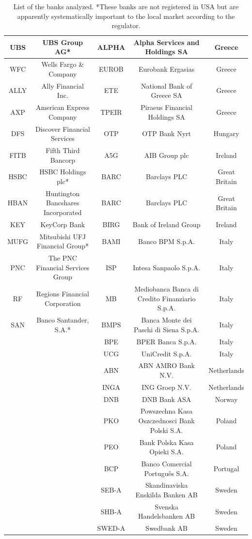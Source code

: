 \documentclass[12pt]{article}
\begin{document}
\begin{table}[!htbp]
\begin{center}
{\begin{tabular}{c|c||c |c|c}
			UBS & UBS Group AG* & ALPHA & Alpha Services and Holdings SA & Greece \\
			\hline
			WFC & Wells Fargo \& Company & EUROB & Eurobank Ergasias & Greece \\
			\hline
			ALLY & Ally Financial Inc. & ETE & National Bank of Greece SA & Greece \\
			\hline
			AXP & American Express Company & TPEIR & Piraeus Financial Holdings SA & Greece \\
			\hline
			DFS & Discover Financial Services & OTP & OTP Bank Nyrt & Hungary \\
			\hline
			FITB & Fifth Third Bancorp & A5G & AIB Group plc & Ireland \\
			\hline
			HSBC & HSBC Holdings plc* & BARC & Barclays PLC & Great Britain \\
			\hline
			HBAN & Huntington Bancshares Incorporated & BARC & Barclays PLC & Great Britain \\
			\hline
			KEY & KeyCorp Bank & BIRG & Bank of Ireland Group & Ireland \\
			\hline
			MUFG & Mitsubishi UFJ Financial Group* & BAMI & Banco BPM S.p.A. & Italy \\
			\hline 
			PNC & The PNC Financial Services Group & ISP & Intesa Sanpaolo S.p.A. & Italy \\
			\hline
			RF & Regions Financial Corporation & MB & Mediobanca Banca di Credito Finanziario S.p.A. & Italy \\
			\hline
			SAN & Banco Santander, S.A.* & BMPS & Banca Monte dei Paschi di Siena S.p.A. & Italy \\
			\hline
			& & BPE & BPER Banca S.p.A. & Italy \\
			\hline
			& & UCG & UniCredit S.p.A. & Italy \\
			\hline
			& & ABN & ABN AMRO Bank N.V. & Netherlands \\
			\hline
			& & INGA & ING Groep N.V. & Netherlands \\
			\hline
			& & DNB & DNB Bank ASA & Norway \\
			\hline
			& & PKO & Powszechna Kasa Oszczednosci Bank Polski S.A. & Poland \\
			\hline
			& & PEO & Bank Polska Kasa Opieki S.A. & Poland \\
			\hline
			& & BCP & Banco Comercial Português S.A. & Portugal \\
			\hline
			& & SEB-A & Skandinaviska Enskilda Banken AB & Sweden \\
			\hline
			& & SHB-A & Svenska Handelsbanken AB & Sweden \\
			\hline
			& & SWED-A & Swedbank AB & Sweden
		\end{tabular}}
	\end{center}
	\caption{List of the banks analyzed. *These banks are not registered in USA but are apparently systematically important to the local market according to the regulator. }
	\label{table:bank_list}
\end{table}
\end{document}
